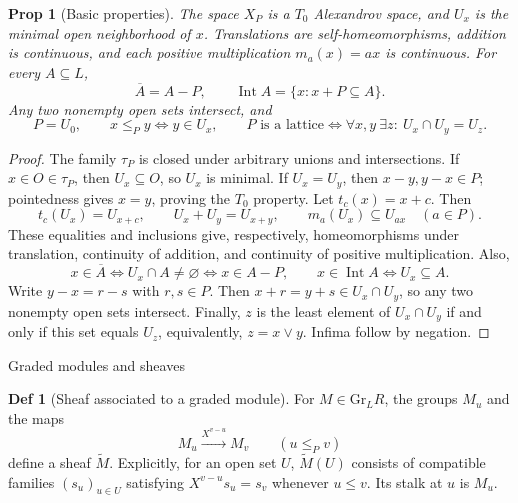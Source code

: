\documentclass[10pt,letterpaper]{amsart}
\makeatletter
\numberwithin{equation}{section}
\newtheorem{prop}[thm]{Prop}
\theoremstyle{definition}
\newtheorem{defn}{Def}[section]
\newcommand{\Gr}{\mathrm{Gr}}
\def\subsection{\@startsection{subsection}{2}
  \z@{.9\linespacing\@plus.3\linespacing}{.4\linespacing}
  {\normalfont\fontsize{11.5}{14}\selectfont\bfseries\boldmath\raggedright}}
\makeatother
\begin{document}
\begin{prop}[Basic properties]\label{prop:carrier-basics}
The space $X_P$ is a $T_0$ Alexandrov space, and $U_x$ is the minimal open neighborhood of $x$. Translations are self-homeomorphisms, addition is continuous, and each positive multiplication $m_a(x)=ax$ is continuous. For every $A\subseteq L$,
\[
\overline A=A-P,\qquad
\operatorname{Int}A=\{x:x+P\subseteq A\}.
\]
Any two nonempty open sets intersect, and
\[
P=U_0,\qquad
x\le_Py\iff y\in U_x,\qquad
P\text{ is a lattice}\iff\forall x,y\ \exists z:\ U_x\cap U_y=U_z.
\]
\end{prop}
\begin{proof}
The family $\tau_P$ is closed under arbitrary unions and intersections. If $x\in O\in\tau_P$, then $U_x\subseteq O$, so $U_x$ is minimal. If $U_x=U_y$, then $x-y,y-x\in P$; pointedness gives $x=y$, proving the $T_0$ property.
Let $t_c(x)=x+c$. Then
\[
t_c(U_x)=U_{x+c},\qquad U_x+U_y=U_{x+y},\qquad
m_a(U_x)\subseteq U_{ax}\quad(a\in P).
\]
These equalities and inclusions give, respectively, homeomorphisms under translation, continuity of addition, and continuity of positive multiplication. Also,
\[
x\in\overline A\iff U_x\cap A\ne\varnothing\iff x\in A-P,
\qquad x\in\operatorname{Int}A\iff U_x\subseteq A.
\]
Write $y-x=r-s$ with $r,s\in P$. Then $x+r=y+s\in U_x\cap U_y$, so any two nonempty open sets intersect.
Finally, $z$ is the least element of $U_x\cap U_y$ if and only if this set equals $U_z$, equivalently, $z=x\vee y$. Infima follow by negation.
\end{proof}

\subsection{Graded modules and sheaves}
\begin{defn}[Sheaf associated to a graded module]\label{def:sheaf}
For $M\in\Gr_LR$, the groups $M_u$ and the maps
\[
M_u\xrightarrow{X^{v-u}}M_v\qquad(u\le_Pv)
\]
define a sheaf $\widetilde M$. Explicitly, for an open set $U$, $\widetilde M(U)$ consists of compatible families $(s_u)_{u\in U}$ satisfying $X^{v-u}s_u=s_v$ whenever $u\le v$. Its stalk at $u$ is $M_u$.
\end{defn}
\end{document}

